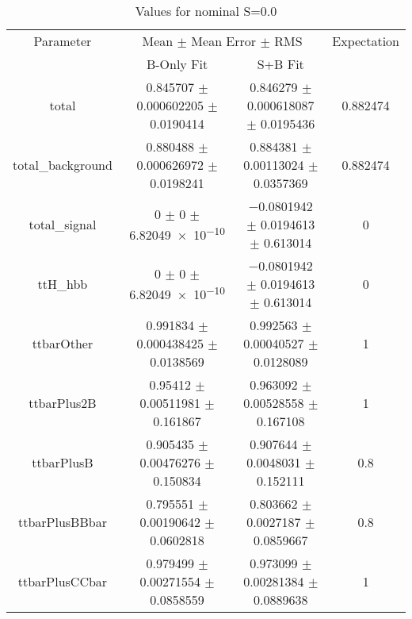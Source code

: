 \begin{table}
\centering
\caption{Values for nominal S=0.0}
\begin{tabular}{cccc}
\toprule
Parameter & \multicolumn{2}{c}{Mean $\pm$ Mean Error $\pm$ RMS} & Expectation\\
 & B-Only Fit & S+B Fit & \\
\midrule
total & \num{0.845707} $\pm$ \num{0.000602205} $\pm$ \num{0.0190414} & \num{0.846279} $\pm$ \num{0.000618087} $\pm$ \num{0.0195436} & \num{0.882474}\\
total\_background & \num{0.880488} $\pm$ \num{0.000626972} $\pm$ \num{0.0198241} & \num{0.884381} $\pm$ \num{0.00113024} $\pm$ \num{0.0357369} & \num{0.882474}\\
total\_signal & \num{0} $\pm$ \num{0} $\pm$ \num{6.82049e-10} & \num{-0.0801942} $\pm$ \num{0.0194613} $\pm$ \num{0.613014} & \num{0}\\
ttH\_hbb & \num{0} $\pm$ \num{0} $\pm$ \num{6.82049e-10} & \num{-0.0801942} $\pm$ \num{0.0194613} $\pm$ \num{0.613014} & \num{0}\\
ttbarOther & \num{0.991834} $\pm$ \num{0.000438425} $\pm$ \num{0.0138569} & \num{0.992563} $\pm$ \num{0.00040527} $\pm$ \num{0.0128089} & \num{1}\\
ttbarPlus2B & \num{0.95412} $\pm$ \num{0.00511981} $\pm$ \num{0.161867} & \num{0.963092} $\pm$ \num{0.00528558} $\pm$ \num{0.167108} & \num{1}\\
ttbarPlusB & \num{0.905435} $\pm$ \num{0.00476276} $\pm$ \num{0.150834} & \num{0.907644} $\pm$ \num{0.0048031} $\pm$ \num{0.152111} & \num{0.8}\\
ttbarPlusBBbar & \num{0.795551} $\pm$ \num{0.00190642} $\pm$ \num{0.0602818} & \num{0.803662} $\pm$ \num{0.0027187} $\pm$ \num{0.0859667} & \num{0.8}\\
ttbarPlusCCbar & \num{0.979499} $\pm$ \num{0.00271554} $\pm$ \num{0.0858559} & \num{0.973099} $\pm$ \num{0.00281384} $\pm$ \num{0.0889638} & \num{1}\\
\bottomrule
\end{tabular}
\end{table}
